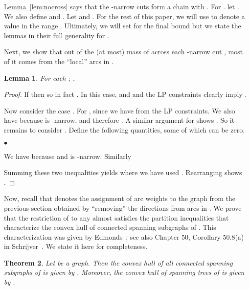 \documentclass[11pt]{article}
\newcommand{\lref}[2][]{\hyperref[#2]{#1~\ref*{#2}}}
\newtheorem{theorem}{Theorem}[section]
\newtheorem{lemma}[theorem]{Lemma}
\theoremstyle{definition}
\newcounter{note}[section]
\newcommand{\initOneLiners}{\setlength{\itemsep}{0pt}
    \setlength{\parsep }{0pt}
    \setlength{\topsep }{0pt}
}
\newenvironment{OneLiners}[1][\ensuremath{\bullet}]
    {\begin{list}
        {#1}
        {\initOneLiners}}
    {\end{list}}
\begin{document}
\lref[Lemma]{lem:nocross} says that the -narrow cuts form a chain
 with .
For . let . We also define
 and . Let  and .
For the rest of this paper, we will use  to denote a value in the range .
Ultimately, we will set  for the final bound but we state the lemmas
in their full generality for .


Next, we show that out of the (at most)  mass of  across
each -narrow cut , most of it comes from the ``local'' arcs
in .


\begin{lemma} \label{lem:li+}
  For each ; . \end{lemma}
\begin{proof}
  If  then  so in fact . In this case, 
  and  and the LP constraints clearly imply .

  Now consider the case .
  For , since  we have  from the LP
  constraints. We also have  because  is
  -narrow, and therefore . A similar argument for  shows
  . So it remains to consider
  .
Define the following quantities, some of which can be zero.
  \begin{OneLiners}
  \item 
  \item 
  \item 
  \end{OneLiners}
  We have
   because  and  is -narrow.  Similarly
  
  Summing these two inequalities yields  where we have used . Rearranging shows .
\end{proof}






Now, recall that  denotes the assignment of arc weights to
the graph  from the previous section obtained by ``removing''
the directions from arcs in .  We prove that the restriction of
 to any  almost satisfies the partition inequalities
that characterize the convex hull of connected spanning subgraphs of . This characterization was given by Edmonds~\cite{Edmonds70b}; see also Chapter 50, Corollary 50.8(a) in Schrijver~\cite{Schrijver-book}. We state it here for completeness.


\begin{theorem}\cite{Edmonds70b}
Let  be a graph. Then the convex hull of all connected spanning subgraphs of  is given by . Moreover, the convex hull of spanning trees of  is given by
.
\end{theorem}
\end{document}
